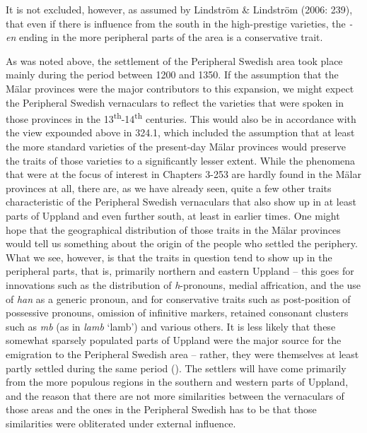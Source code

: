 \begin{styleBodytextC}
It is not excluded, however, as assumed by Lindström \& Lindström (2006: 239), that even if there is influence from the south in the high-prestige varieties, the\textit{ -}\textit{en} ending in the more peripheral parts of the area is a conservative trait.

\end{styleBodytextC}

\begin{styleBodytextC}
As was noted above, the settlement of the Peripheral Swedish area took place mainly during the period between 1200 and 1350. If the assumption that the Mälar provinces were the major contributors to this expansion, we might expect the Peripheral Swedish vernaculars to reflect the varieties that were spoken in those provinces in the 13\textsuperscript{th}{}-14\textsuperscript{th} centuries. This would also be in accordance with the view expounded above in 324.1, which included the assumption that at least the more standard varieties of the present-day Mälar provinces would preserve the traits of those varieties to a significantly lesser extent. While the phenomena that were at the focus of interest in Chapters 3{}-253 are hardly found in the Mälar provinces at all, there are, as we have already seen, quite a few other traits characteristic of the Peripheral Swedish vernaculars that also show up in at least parts of Uppland and even further south, at least in earlier times. One might hope that the geographical distribution of those traits in the Mälar provinces would tell us something about the origin of the people who settled the periphery. What we see, however, is that the traits in question tend to show up in the peripheral parts, that is, primarily northern and eastern Uppland – this goes for innovations such as the distribution of \textit{h}{}-pronouns, medial affrication, and the use of \textit{han} as a generic pronoun, and for conservative traits such as post-position of possessive pronouns, omission of infinitive markers, retained consonant clusters such as \textit{mb }(as in\textit{ lamb} ‘lamb’) and various others. It is less likely that these somewhat sparsely populated parts of Uppland were the major source for the emigration to the Peripheral Swedish area – rather, they were themselves at least partly settled during the same period (\citet{Broberg1990}). The settlers will have come primarily from the more populous regions in the southern and western parts of Uppland, and the reason that there are not more similarities between the vernaculars of those areas and the ones in the Peripheral Swedish has to be that those similarities were obliterated under external influence. 

\end{styleBodytextC}

